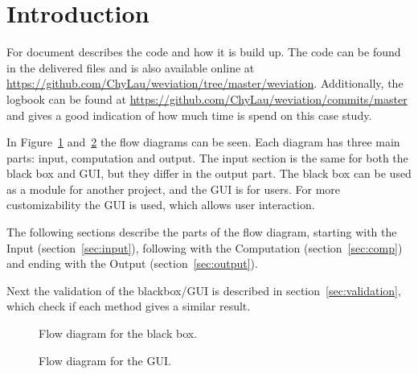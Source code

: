 \section{Introduction}
For document describes the code and how it is build up.
The code can be found in the delivered files and is also available online at \url{https://github.com/ChyLau/weviation/tree/master/weviation}.
Additionally, the logbook can be found at \url{https://github.com/ChyLau/weviation/commits/master} and gives a good indication of how much time is spend on this case study.

In Figure~\ref{fig:flow_bb} and~\ref{fig:flow_gui} the flow diagrams can be seen. Each diagram has three main parts: input, computation and output.
The input section is the same for both the black box and GUI, but they differ in the output part.
The black box can be used as a module for another project, and the GUI is for users.
For more customizability the GUI is used, which allows user interaction.

The following sections describe the parts of the flow diagram, starting with the Input (section~\ref{sec:input}), following with the Computation (section~\ref{sec:comp}) and ending with the Output (section~\ref{sec:output}).

Next the validation of the blackbox/GUI is described in section~\ref{sec:validation}, which check if each method gives a similar result.

\begin{figure}[h]
\centering

\caption{Flow diagram for the black box.} \label{fig:flow_bb}
\end{figure}

\begin{figure}[h]
\centering

\caption{Flow diagram for the GUI.} \label{fig:flow_gui}
\end{figure}
